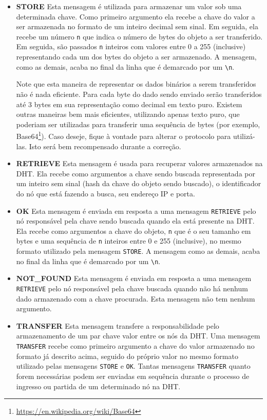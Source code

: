 \documentclass[oneside,12pt,a4paper]{article}
\begin{document}
\begin{itemize}
\item \textbf{STORE} Esta mensagem é utilizada para armazenar um valor
  sob uma determinada chave. Como primeiro argumento ela recebe a
  chave do valor a ser armazenada no formato de um inteiro decimal sem
  sinal. Em seguida, ela recebe um número \texttt{n} que indica o
  número de bytes do objeto a ser transferido. Em seguida, são
  passados \texttt{n} inteiros com valores entre 0 a 255 (inclusive)
  representando cada um dos bytes do objeto a ser armazenado. A
  mensagem, como as demais, acaba no final da linha que é demarcado
  por um \texttt{\textbackslash{}n}.

  Note que esta maneira de representar os dados binários a serem
  transferidos não é nada eficiente. Para cada byte do dado sendo
  enviado serão transferidos até 3 bytes em sua representação como
  decimal em texto puro. Existem outras maneiras bem mais eficientes,
  utilizando apenas texto puro, que poderiam ser utilizadas para
  transferir uma sequência de bytes (por exemplo,
  Base64\footnote{\url{https://en.wikipedia.org/wiki/Base64}}). Caso
  deseje, fique à vontade para alterar o protocolo para
  utilizá-las. Isto será bem recompensado durante a correção.

\item \textbf{RETRIEVE} Esta mensagem é usada para recuperar valores
  armazenados na DHT. Ela recebe como argumentos a chave sendo buscada
  representada por um inteiro sem sinal (hash da chave do objeto sendo
  buscado), o identificador do nó que está fazendo a busca, seu
  endereço IP e porta.

\item \textbf{OK} Esta mensagem é enviada em resposta a uma mensagem
  \texttt{RETRIEVE} pelo nó responsável pela chave sendo buscada
  quando ela está presente na DHT. Ela recebe como argumentos a chave
  do objeto, \texttt{n} que é o seu tamanho em bytes e uma
  sequência de \texttt{n} inteiros entre 0 e 255 (inclusive), no mesmo
  formato utilizado pela mensagem \texttt{STORE}. A mensagem como as
  demais, acaba no final da linha que é demarcado por um
  \texttt{\textbackslash{}n}.

\item \textbf{NOT\_FOUND} Esta mensagem é enviada em resposta a uma
  mensagem \texttt{RETRIEVE} pelo nó responsável pela chave buscada
  quando não há nenhum dado armazenado com a chave procurada. Esta
  mensagem não tem nenhum argumento.

\item \textbf{TRANSFER} Esta mensagem transfere a responsabilidade
  pelo armazenamento de um par chave valor entre os nós da DHT. Uma
  mensagem \texttt{TRANSFER} recebe como primeiro argumento a chave do
  valor armazenado no formato já descrito acima, seguido do próprio
  valor no mesmo formato utilizado pelas mensagens \texttt{STORE} e
  \texttt{OK}. Tantas mensagens \texttt{TRANSFER} quanto forem
  necessárias podem ser enviadas em sequência durante o processo de
  ingresso ou partida de um determinado nó na DHT.

\end{itemize}
\end{document}
